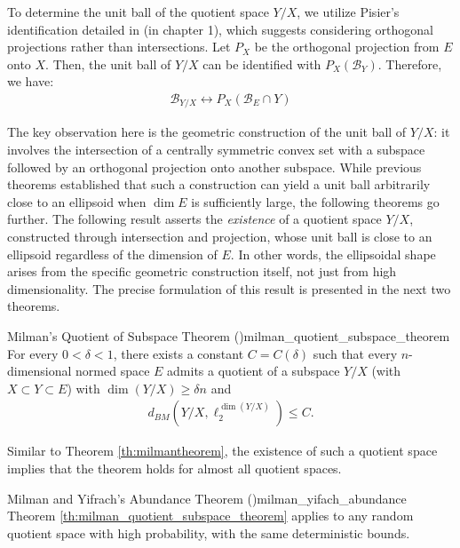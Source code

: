 To determine the unit ball of the quotient space $Y/X$, we utilize Pisier's identification detailed in \cite{pisierVolumeConvexBodies1989} (in chapter 1), which suggests considering orthogonal projections rather than intersections.  Let $P_X$ be the orthogonal projection from $E$ onto $X$. Then, the unit ball of $Y/X$ can be identified with $P_X(\mathcal{B}_Y)$. Therefore, we have:
\begin{align*}
\mathcal{B}_{Y/X} \longleftrightarrow P_X(\mathcal{B}_E \cap Y)
\end{align*}

The key observation here is the geometric construction of the unit ball of $Y/X$: it involves the intersection of a centrally symmetric convex set with a subspace followed by an orthogonal projection onto another subspace. While previous theorems established that such a construction can yield a unit ball arbitrarily close to an ellipsoid when $\dim E$ is sufficiently large, the following theorems go further. The following result asserts the \emph{existence} of a quotient space $Y/X$, constructed through intersection and projection, whose unit ball is close to an ellipsoid regardless of the dimension of $E$. In other words, the ellipsoidal shape arises from the specific geometric construction itself, not just from high dimensionality.  The precise formulation of this result is presented in the next two theorems.
\begin{theorembox}{Milman's Quotient of Subspace Theorem (\cite{artstein-avidanAsymptoticGeometricAnalysis2015})}{milman_quotient_subspace_theorem}
    For every $0<\delta<1$, there exists a constant $C = C(\delta)$ such that every $n$-dimensional normed space $E$ admits a quotient of a subspace $Y/X$ (with $X\subset Y\subset E$) with $\dim(Y/X) \geq \delta n$ and 
        \begin{align*}
        d_{BM}(Y/X, \ell_2^{\dim(Y/X)}) \leq C.
        \end{align*}
\end{theorembox}

Similar to Theorem \ref{th:milmantheorem}, the existence of such a quotient space implies that the theorem holds for almost all quotient spaces.
\begin{theorembox}{Milman and Yifrach's Abundance Theorem (\cite{milmanRegularRandomSections2021})}{milman_yifach_abundance}
    Theorem \ref{th:milman_quotient_subspace_theorem} applies to any random quotient space with high probability, with the same deterministic bounds.
\end{theorembox}


